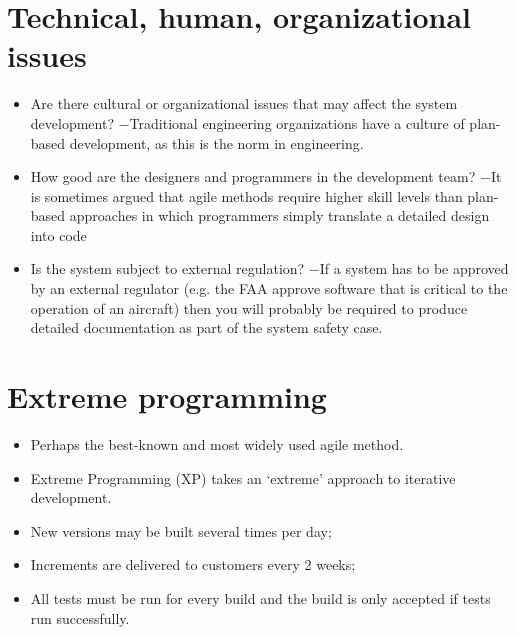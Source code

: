 \section{Technical, human, organizational issues}
\begin{itemize}

\item Are there cultural or organizational issues that may affect the system development?
\newline $-$Traditional engineering organizations have a culture of plan-based development, as this is the norm in engineering.
\item How good are the designers and programmers in the development team?
\newline $-$It is sometimes argued that agile methods require higher skill levels than plan-based approaches in which programmers simply translate a detailed design into code
\item Is the system subject to external regulation?
\newline $-$If a system has to be approved by an external regulator (e.g. the FAA approve software that is critical to the operation of an aircraft) then you will probably be required to produce detailed documentation as part of the system safety case.

\end{itemize}
\section{ Extreme programming}
\begin{itemize}

\item Perhaps the best-known and most widely used agile method.

\item Extreme Programming (XP) takes an ‘extreme’ approach to iterative development.

\item New versions may be built several times per day; \item Increments are delivered to customers every 2 weeks;
\item All tests must be run for every build and the build is only accepted if tests run successfully.

\end{itemize}

